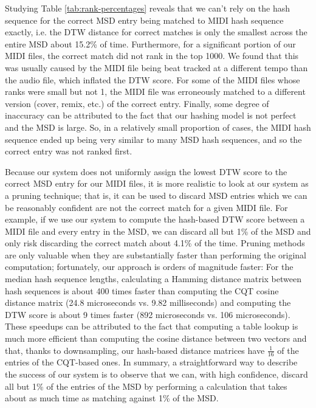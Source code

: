 \documentclass{article}
\begin{document}
Studying Table \ref{tab:rank-percentages} reveals that we can't rely on the hash sequence for the correct MSD entry being matched to MIDI hash sequence exactly, i.e. the DTW distance for correct matches is only the smallest across the entire MSD about 15.2\% of time.
Furthermore, for a significant portion of our MIDI files, the correct match did not rank in the top 1000.
We found that this was usually caused by the MIDI file being beat tracked at a different tempo than the audio file, which inflated the DTW score.
For some of the MIDI files whose ranks were small but not 1, the MIDI file was erroneously matched to a different version (cover, remix, etc.) of the correct entry.
Finally, some degree of inaccuracy can be attributed to the fact that our hashing model is not perfect and the MSD is large.
So, in a relatively small proportion of cases, the MIDI hash sequence ended up being very similar to many MSD hash sequences, and so the correct entry was not ranked first.

Because our system does not uniformly assign the lowest DTW score to the correct MSD entry for our MIDI files, it is more realistic to look at our system as a pruning technique; that is, it can be used to discard MSD entries which we can be reasonably confident are not the correct match for a given MIDI file.
For example, if we use our system to compute the hash-based DTW score between a MIDI file and every entry in the MSD, we can discard all but 1\% of the MSD and only risk discarding the correct match about 4.1\% of the time.
Pruning methods are only valuable when they are substantially faster than performing the original computation; fortunately, our approach is orders of magnitude faster:
For the median hash sequence lengths, calculating a Hamming distance matrix between hash sequences is about 400 times faster than computing the CQT cosine distance matrix (24.8 microseconds vs. 9.82 milliseconds) and computing the DTW score is about 9 times faster (892 microseconds vs. 106 microseconds).
These speedups can be attributed to the fact that computing a table lookup is much more efficient than computing the cosine distance between two vectors and that, thanks to downsampling, our hash-based distance matrices have $\frac{1}{16}$ of the entries of the CQT-based ones.
In summary, a straightforward way to describe the success of our system is to observe that we can, with high confidence, discard all but 1\% of the entries of the MSD by performing a calculation that takes about as much time as matching against 1\% of the MSD.
\end{document}
